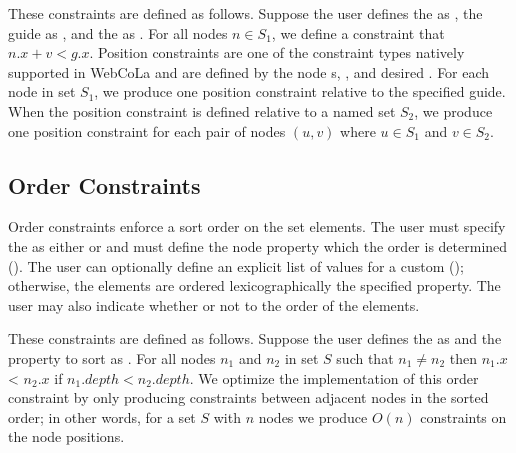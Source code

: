 These constraints are defined as follows. Suppose the user defines the
 as ,
the guide as , and the  as . 
For all nodes $n \in S_1$, we define a constraint that \mbox{$n.x + v < g.x$}.
Position constraints are one of the constraint types natively supported in
WebCoLa and are defined by the node 
s, , and desired . For each node
in set $S_1$, we produce one position constraint relative to the specified guide.
When the position constraint is defined relative to a named set $S_2$,
we produce one position constraint for each pair of nodes $(u, v)$ where $u \in S_1$ and $v \in S_2$.

\vspace{-5px}
\subsection{Order Constraints}
Order constraints enforce a sort order on the set elements. The user must 
specify the  as either  or  and must define
the node property  which the order is determined 
(). 
The user can optionally define an explicit list of values for a custom
 (); 
otherwise, the elements are ordered lexicographically 
the specified property. The user may also indicate whether
or not to  the order of the elements.

These constraints are defined as follows.  Suppose the user defines the  as
 and the property to sort  as . For all nodes $n_1$ 
and $n_2$ in set $S$ such that $n_1 \neq n_2$ then $n_1.x$ < $n_2.x$
if \mbox{$n_1.depth < n_2.depth$}. We optimize the implementation of this order
constraint by only producing constraints between adjacent nodes in the sorted 
order; in other words, for a set $S$ with $n$ nodes we produce $O(n)$ 
constraints on the node positions.

